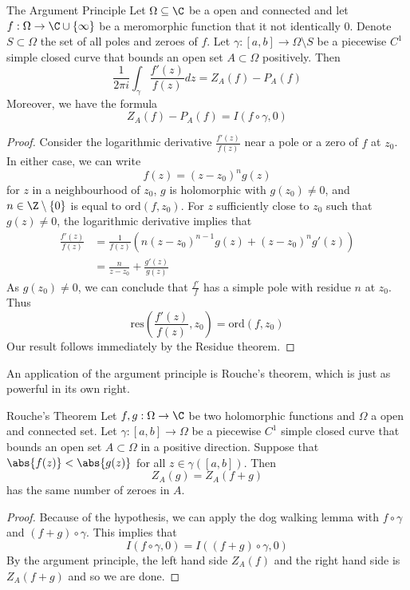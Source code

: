 \documentclass[a4paper]{article}
\begin{document}
\begin{thm}{The Argument Principle}{} Let $\Omega\subseteq\C$ be a open and connected and let $f:\Omega\to\C\cup\{\infty\}$ be a meromorphic function that it not identically $0$. Denote $S\subset\Omega$ the set of all poles and zeroes of $f$. Let $\gamma:[a,b]\to\Omega\setminus S$ be a piecewise $C^1$ simple closed curve that bounds an open set $A\subset\Omega$ positively. Then $$\frac{1}{2\pi i}\int_\gamma\frac{f'(z)}{f(z)}dz=Z_A(f)-P_A(f)$$ Moreover, we have the formula $$Z_A(f)-P_A(f)=I(f\circ\gamma,0)$$ 
\begin{proof}
Consider the logarithmic derivative $\frac{f'(z)}{f(z)}$ near a pole or a zero of $f$ at $z_0$. In either case, we can write $$f(z)=(z-z_0)^ng(z)$$ for $z$ in a neighbourhood of $z_0$, $g$ is holomorphic with $g(z_0)\neq 0$, and $n\in\Z\setminus\{0\}$ is equal to $\text{ord}(f,z_0)$. For $z$ sufficiently close to $z_0$ such that $g(z)\neq 0$, the logarithmic derivative implies that 
\begin{align*}
\frac{f'(z)}{f(z)}&=\frac{1}{f(z)}\left(n(z-z_0)^{n-1}g(z)+(z-z_0)^ng'(z)\right)\\
&=\frac{n}{z-z_0}+\frac{g'(z)}{g(z)}
\end{align*}
As $g(z_0)\neq 0$, we can conclude that $\frac{f'}{f}$ has a simple pole with residue $n$ at $z_0$. Thus $$\text{res}\left(\frac{f'(z)}{f(z)},z_0\right)=\text{ord}(f,z_0)$$ Our result follows immediately by the Residue theorem. 
\end{proof}
\end{thm}

An application of the argument principle is Rouche's theorem, which is just as powerful in its own right. 

\begin{thm}{Rouche's Theorem}{} Let $f,g:\Omega\to\C$ be two holomorphic functions and $\Omega$ a open and connected set. Let $\gamma:[a,b]\to\Omega$ be a piecewise $C^1$ simple closed curve that bounds an open set $A\subset\Omega$ in a positive direction. Suppose that $\abs{f(z)}<\abs{g(z)}$ for all $z\in\gamma([a,b])$. Then $$Z_A(g)=Z_A(f+g)$$ has the same number of zeroes in $A$. 
\begin{proof}
Because of the hypothesis, we can apply the dog walking lemma with $f\circ\gamma$ and $(f+g)\circ\gamma$. This implies that $$I(f\circ\gamma,0)=I\left((f+g)\circ\gamma,0\right)$$ By the argument principle, the left hand side $Z_A(f)$ and the right hand side is $Z_A(f+g)$ and so we are done. 
\end{proof}
\end{thm}
\end{document}
